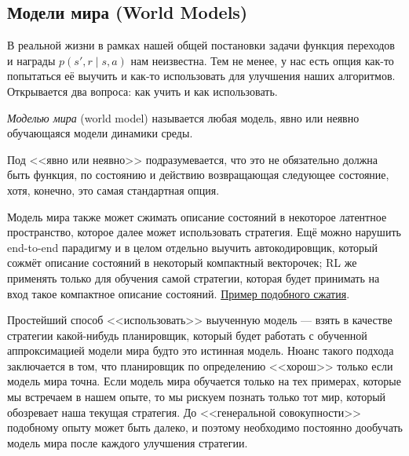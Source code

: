 \subsection{Модели мира (World Models)}

В реальной жизни в рамках нашей общей постановки задачи функция переходов и награды $p(s', r \mid s, a)$ нам неизвестна. Тем не менее, у нас есть опция как-то попытаться её выучить и как-то использовать для улучшения наших алгоритмов. Открывается два вопроса: как учить и как использовать.

\begin{definition}
\emph{Моделью мира} (world model) называется любая модель, явно или неявно обучающаяся модели динамики среды.
\end{definition}

Под <<явно или неявно>> подразумевается, что это не обязательно должна быть функция, по состоянию и действию возвращающая следующее состояние, хотя, конечно, это самая стандартная опция.

\begin{remark}
Модель мира также может сжимать описание состояний в некоторое латентное пространство, которое далее может использовать стратегия. Ещё можно нарушить end-to-end парадигму и в целом отдельно выучить автокодировщик, который сожмёт описание состояний в некоторый компактный векторочек; RL же применять только для обучения самой стратегии, которая будет принимать на вход такое компактное описание состояний. \href{https://worldmodels.github.io/assets/mp4/carracing_vae_compare.mp4}{Пример подобного сжатия}.
\end{remark}

Простейший способ <<использовать>> выученную модель --- взять в качестве стратегии какой-нибудь планировщик, который будет работать с обученной аппроксимацией модели мира будто это истинная модель. Нюанс такого подхода заключается в том, что планировщик по определению <<хорош>> только если модель мира точна. Если модель мира обучается только на тех примерах, которые мы встречаем в нашем опыте, то мы рискуем познать только тот мир, который обозревает наша текущая стратегия. До <<генеральной совокупности>> подобному опыту может быть далеко, и поэтому необходимо постоянно дообучать модель мира после каждого улучшения стратегии.


